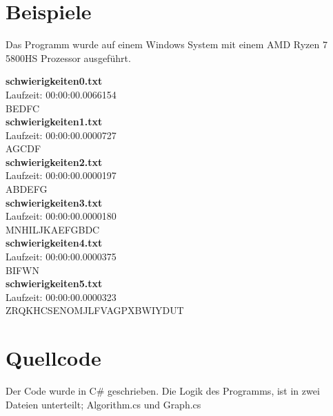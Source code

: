 \documentclass[a4paper,10pt,ngerman]{scrartcl}
\begin{document}
\section{Beispiele}
Das Programm wurde auf einem Windows System mit einem AMD Ryzen 7 5800HS Prozessor ausgeführt.

\textbf{schwierigkeiten0.txt}\\
Laufzeit: 00:00:00.0066154\\
BEDFC\\

\textbf{schwierigkeiten1.txt}\\
Laufzeit: 00:00:00.0000727\\
AGCDF\\

\textbf{schwierigkeiten2.txt}\\
Laufzeit: 00:00:00.0000197\\
ABDEFG\\

\textbf{schwierigkeiten3.txt}\\
Laufzeit: 00:00:00.0000180\\
MNHILJKAEFGBDC\\

\textbf{schwierigkeiten4.txt}\\
Laufzeit: 00:00:00.0000375\\
BIFWN\\

\textbf{schwierigkeiten5.txt}\\
Laufzeit: 00:00:00.0000323\\
ZRQKHCSENOMJLFVAGPXBWIYDUT\\

\section{Quellcode}
Der Code wurde in C# geschrieben. Die Logik des Programms, ist in zwei Dateien unterteilt; Algorithm.cs und Graph.cs
\end{document}
